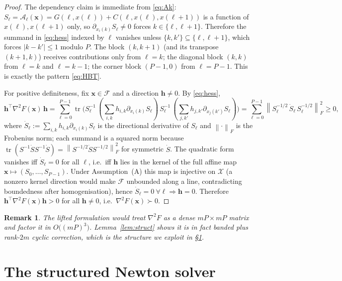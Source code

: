 \documentclass{amsart}
\newtheorem{remark}{Remark}
\newcommand{\tr}{\operatorname{tr}}
\newcommand{\norm}[1]{\left\lVert#1\right\rVert}
\begin{document}
\begin{proof}
The dependency claim is immediate from \eqref{eq:Ak}: $S_\ell=\mathcal A_\ell(\bm
x)=G(\ell,x(\ell))+C(\ell,x(\ell),x(\ell+1))$ is a function of $x(\ell),x(\ell+1)$
only, so $\partial_{x_i(k)}S_\ell\neq0$ forces $k\in\{\ell,\ell+1\}$. Therefore the
summand in \eqref{eq:hess} indexed by $\ell$ vanishes unless
$\{k,k'\}\subseteq\{\ell,\ell+1\}$, which forces $|k-k'|\le1$ modulo $P$. The block
$(k,k+1)$ (and its transpose $(k+1,k)$) receives contributions only from $\ell=k$;
the diagonal block $(k,k)$ from $\ell=k$ and $\ell=k-1$; the corner block $(P-1,0)$
from $\ell=P-1$. This is exactly the pattern \eqref{eq:HBT}.

For positive definiteness, fix $\bm x\in\mathcal F$ and a direction $\bm h\neq0$.
By \eqref{eq:hess},
\[
  \bm h^{\!\top}\nabla^2 F(\bm x)\,\bm h
  =\sum_{\ell=0}^{P-1}\tr\!\big(S_\ell^{-1}\,(\textstyle\sum_{i,k}h_{i,k}\partial_{x_i(k)}S_\ell)\,
                                 S_\ell^{-1}\,(\textstyle\sum_{j,k'}h_{j,k'}\partial_{x_j(k')}S_\ell)\big)
  =\sum_{\ell=0}^{P-1}\norm{S_\ell^{-1/2}\,\dot S_\ell\,S_\ell^{-1/2}}_F^2\ge0,
\]
where $\dot S_\ell:=\sum_{i,k}h_{i,k}\partial_{x_i(k)}S_\ell$ is the directional
derivative of $S_\ell$ and $\norm{\cdot}_F$ is the Frobenius norm; each summand is a
squared norm because $\tr(S^{-1}\dot S S^{-1}\dot S)=\norm{S^{-1/2}\dot S
S^{-1/2}}_F^2$ for symmetric $\dot S$. The quadratic form vanishes iff $\dot
S_\ell=0$ for all $\ell$, i.e.\ iff $\bm h$ lies in the kernel of the full affine map
$\bm x\mapsto(S_0,\dots,S_{P-1})$. Under Assumption~(A) this map is injective on
$\mathcal X$ (a nonzero kernel direction would make $\mathcal F$ unbounded along a
line, contradicting boundedness after homogenisation), hence $\dot S_\ell=0\ \forall
\ell\Rightarrow\bm h=0$. Therefore $\bm h^{\!\top}\nabla^2F(\bm x)\bm h>0$ for all
$\bm h\neq0$, i.e.\ $\nabla^2F(\bm x)\succ0$.
\end{proof}

\begin{remark}
The lifted formulation would treat $\nabla^2F$ as a dense $mP\times mP$ matrix and
factor it in $O\!\big((mP)^3\big)$. Lemma~\ref{lem:struct} shows it is in fact
banded plus rank-$2m$ cyclic correction, which is the structure we exploit in
\S\ref{sec:linalg}.
\end{remark}

\section{The structured Newton solver}\label{sec:linalg}
\end{document}
